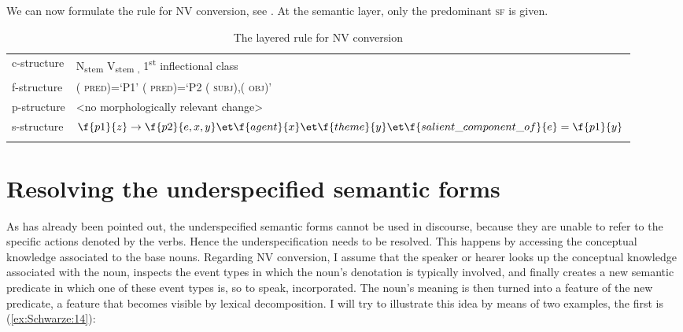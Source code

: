 \documentclass[output=paper]{langsci/langscibook}
\begin{document}
We can now formulate the rule for  N\textrightarrow{}V conversion, see . At the semantic layer, only the predominant \textsc{sf} is given.

\begin{table}
\begin{tabular}{lp{}}
\lsptoprule

{{c-structure}} &

N\textsubscript{stem} \textrightarrow{}V\textsubscript{stem ,} 1\textsuperscript{st}
inflectional class\\

{{f-structure}} &

(\textuparrow{} \textsc{pred)=`P1' \textrightarrow{} } (\textuparrow{} \textsc{pred)=`P2 (\textuparrow{} subj),(\textuparrow{} obj)'}\\
{{p-structure}} &

\textless{}no morphologically relevant change\textgreater{}\\

{{s-structure}} &

 $\f{p1}{z}\to \f{p2}{e,x,y} \et \f{agent}{x}\et \f{theme}{y} \et \f{salient\_component\_of}{e} = \f{p1}{y}$

\\
\lspbottomrule
\end{tabular}
\caption{The layered rule for N\textrightarrow{}V conversion}
\label{tab:Schwarze:4}
\end{table}

\section{Resolving the underspecified semantic forms}\label{resolving-the-underspecified-semantic-forms}
As has already been pointed out, the underspecified semantic forms cannot be used in discourse, because they are unable to refer to the specific actions denoted by the verbs. Hence the underspecification needs to be resolved. This happens by accessing the conceptual knowledge associated to the base nouns. Regarding N\textrightarrow{}V conversion, I assume that the speaker or hearer looks up the conceptual knowledge associated with the noun, inspects the event types in which the noun's denotation is typically involved, and finally creates a new semantic predicate in which one of these event types is, so to speak, incorporated. The noun's meaning is then turned into a feature of the new predicate, a feature that becomes visible by lexical decomposition. I will try to illustrate this idea by means of two examples, the first is (\ref{ex:Schwarze:14}):
\end{document}
